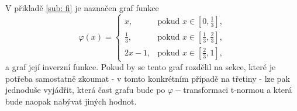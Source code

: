 \begin{example}
\end{example}

 V p\v riklad\v e \ref{sub: fi} je nazna\v cen graf funkce $$\varphi(x) = \begin{cases} x, & \mbox {pokud } x \in [0,\frac{1}{3}],
    \\ \frac{1}{3}, & \mbox {pokud } x \in [\frac{1}{3}, \frac{2}{3}],\\
    2x - 1, & \mbox {pokud } x \in [\frac{2}{3}, 1],
    \end{cases}$$ a graf jej\' i inverzn\' i funkce. Pokud by se tento graf rozd\v elil na sekce, kter\' e je pot\v reba samostatn\v e zkoumat - v tomto konkr\' etn\' im p\v r\' ipad\v e na t\v retiny - lze pak jednodu\v se vyjádřit, kter\' a \v cast grafu bude po $ \varphi - $transformaci t-normou a  kter\' a bude naopak nab\' yvat jin\' ych hodnot.
    
